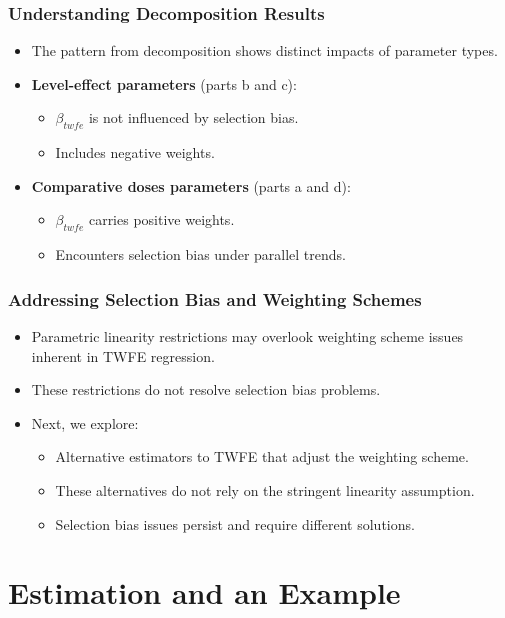 \documentclass{beamer}
\begin{document}
\begin{frame}
\frametitle{Understanding Decomposition Results}

\begin{itemize}
  \item The pattern from decomposition shows distinct impacts of parameter types.
  \item \textbf{Level-effect parameters} (parts b and c):
    \begin{itemize}
      \item $\beta_{twfe}$ is not influenced by selection bias.
      \item Includes negative weights.
    \end{itemize}
  \item \textbf{Comparative doses parameters} (parts a and d):
    \begin{itemize}
      \item $\beta_{twfe}$ carries positive weights.
      \item Encounters selection bias under parallel trends.
    \end{itemize}
\end{itemize}
\end{frame}


\begin{frame}
\frametitle{Addressing Selection Bias and Weighting Schemes}

\begin{itemize}
  \item Parametric linearity restrictions may overlook weighting scheme issues inherent in TWFE regression.
  \item These restrictions do not resolve selection bias problems.
  \item Next, we explore:
    \begin{itemize}
      \item Alternative estimators to TWFE that adjust the weighting scheme.
      \item These alternatives do not rely on the stringent linearity assumption.
      \item Selection bias issues persist and require different solutions.
    \end{itemize}
\end{itemize}
\end{frame}

\section{Estimation and an Example}
\end{document}
